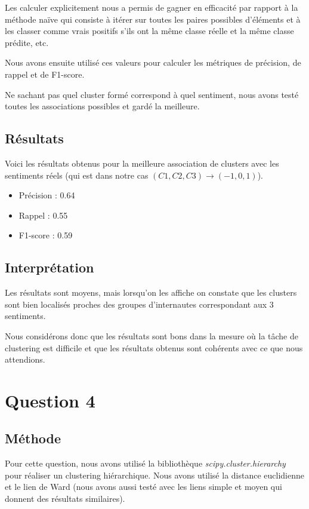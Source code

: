 \documentclass{article}
\begin{document}
Les calculer explicitement nous a permis de gagner en efficacité par 
rapport à la méthode naïve qui consiste à itérer sur toutes les paires 
possibles d'éléments et à les classer comme vrais positifs s'ils ont la même 
classe réelle et la même classe prédite, etc.

Nous avons ensuite utilisé ces valeurs pour calculer les métriques de précision,
de rappel et de F1-score.

Ne sachant pas quel cluster formé correspond à quel sentiment, nous avons
testé toutes les associations possibles et gardé la meilleure.

\subsection*{Résultats}

Voici les résultats obtenus pour la meilleure association de clusters
avec les sentiments réels 
(qui est dans notre cas $(C1, C2, C3) \rightarrow (-1, 0, 1)$).

\begin{itemize}
    \item Précision : 0.64
    \item Rappel : 0.55
    \item F1-score : 0.59
\end{itemize}

\subsection*{Interprétation}

Les résultats sont moyens, mais lorsqu'on les affiche on constate que 
les clusters sont bien localisés proches des groupes d'internautes 
correspondant aux 3 sentiments.

Nous considérons donc que les résultats sont bons dans la mesure où la tâche
de clustering est difficile et que les résultats obtenus sont cohérents avec 
ce que nous attendions.

\section*{Question 4}

\subsection*{Méthode}

Pour cette question, nous avons utilisé la bibliothèque \textit{scipy.cluster.hierarchy}
pour réaliser un clustering hiérarchique. Nous avons utilisé la distance euclidienne
et le lien de Ward (nous avons aussi testé avec les liens simple et moyen qui donnent
des résultats similaires).
\end{document}
